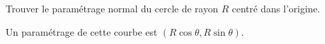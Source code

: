 \begin{exercice}\label{exocontrolecontinu0012}

Trouver le paramétrage normal du cercle de rayon $R$ centré dans l'origine. 

Un paramétrage de cette courbe est $(R\cos\theta, R\sin\theta)$.  

  
\end{exercice}
